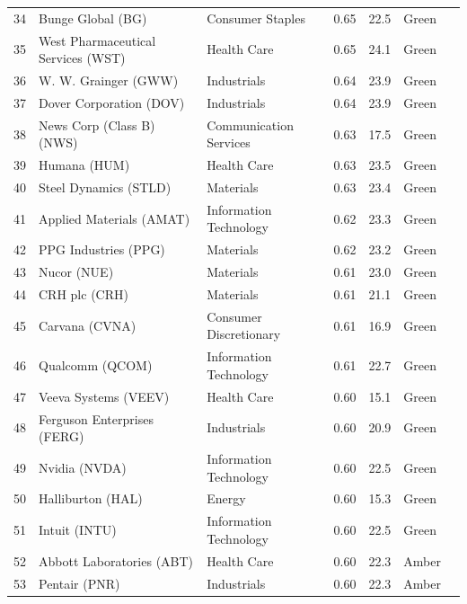 \documentclass[11pt,a4paper]{article}
\begin{document}
{\begin{longtable}{r p{4.4cm} p{2.8cm} r r l l}
34 & Bunge Global (BG) & Consumer Staples & 0.65 & 22.5 & \cellcolor[HTML]{C6EFCE}Green &  \\
35 & West Pharmaceutical Services (WST) & Health Care & 0.65 & 24.1 & \cellcolor[HTML]{C6EFCE}Green &  \\
36 & W. W. Grainger (GWW) & Industrials & 0.64 & 23.9 & \cellcolor[HTML]{C6EFCE}Green &  \\
37 & Dover Corporation (DOV) & Industrials & 0.64 & 23.9 & \cellcolor[HTML]{C6EFCE}Green &  \\
38 & News Corp (Class B) (NWS) & Communication Services & 0.63 & 17.5 & \cellcolor[HTML]{C6EFCE}Green &  \\
39 & Humana (HUM) & Health Care & 0.63 & 23.5 & \cellcolor[HTML]{C6EFCE}Green &  \\
40 & Steel Dynamics (STLD) & Materials & 0.63 & 23.4 & \cellcolor[HTML]{C6EFCE}Green &  \\
41 & Applied Materials (AMAT) & Information Technology & 0.62 & 23.3 & \cellcolor[HTML]{C6EFCE}Green &  \\
42 & PPG Industries (PPG) & Materials & 0.62 & 23.2 & \cellcolor[HTML]{C6EFCE}Green &  \\
43 & Nucor (NUE) & Materials & 0.61 & 23.0 & \cellcolor[HTML]{C6EFCE}Green &  \\
44 & CRH plc (CRH) & Materials & 0.61 & 21.1 & \cellcolor[HTML]{C6EFCE}Green &  \\
45 & Carvana (CVNA) & Consumer Discretionary & 0.61 & 16.9 & \cellcolor[HTML]{C6EFCE}Green &  \\
46 & Qualcomm (QCOM) & Information Technology & 0.61 & 22.7 & \cellcolor[HTML]{C6EFCE}Green &  \\
47 & Veeva Systems (VEEV) & Health Care & 0.60 & 15.1 & \cellcolor[HTML]{C6EFCE}Green &  \\
48 & Ferguson Enterprises (FERG) & Industrials & 0.60 & 20.9 & \cellcolor[HTML]{C6EFCE}Green &  \\
49 & Nvidia (NVDA) & Information Technology & 0.60 & 22.5 & \cellcolor[HTML]{C6EFCE}Green &  \\
50 & Halliburton (HAL) & Energy & 0.60 & 15.3 & \cellcolor[HTML]{C6EFCE}Green &  \\
51 & Intuit (INTU) & Information Technology & 0.60 & 22.5 & \cellcolor[HTML]{C6EFCE}Green &  \\
52 & Abbott Laboratories (ABT) & Health Care & 0.60 & 22.3 & \cellcolor[HTML]{FFEB9C}Amber &  \\
53 & Pentair (PNR) & Industrials & 0.60 & 22.3 & \cellcolor[HTML]{FFEB9C}Amber &  \\

\end{longtable}}
\end{document}
